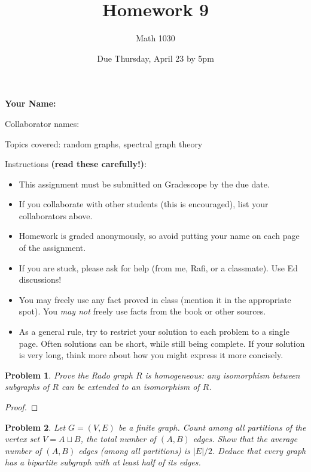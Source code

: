 \documentclass[11pt]{article}
\author{Math 1030}
\date{Due Thursday, April 23 by 5pm}
\title{Homework 9}
\newtheorem{problem}{Problem}
\begin{document}
\maketitle

{\bf\Large Your Name:} 

Collaborator names: 

\vspace{.3in}
Topics covered: random graphs, spectral graph theory

Instructions {\bf (read these carefully!)}: 
\begin{itemize}
\item This assignment must be submitted on Gradescope by the due date. 
\item If you collaborate with other students (this is encouraged),  list your collaborators above. 
\item Homework is graded anonymously, so avoid putting your name on each page of the assignment.
\item If you are stuck, please ask for help (from me, Rafi, or a classmate). Use Ed discussions!  
\item You may freely use any fact proved in class (mention it in the appropriate spot). You \emph{may not} freely use facts from the book or other sources.
\item As a general rule, try to restrict your solution to each problem to a single page. Often solutions can be short, while still being complete. If your solution is very long, think more about how you might express it more concisely.
\end{itemize}
\pagebreak 


\begin{problem}
Prove the Rado graph $R$ is homogeneous: any isomorphism between subgraphs of $R$ can be extended to an isomorphism of $R$. 
\end{problem}

\begin{proof}

\end{proof}

\pagebreak 

\begin{problem}
Let $G=(V,E)$ be a finite graph. Count among all partitions of the vertex set $V=A\sqcup B$, the total number of $(A,B)$ edges. Show that the average number of $(A,B)$ edges (among all partitions) is $|E|/2$. Deduce that every graph has a bipartite subgraph with at least half of its edges. 
\end{problem}
\end{document}

